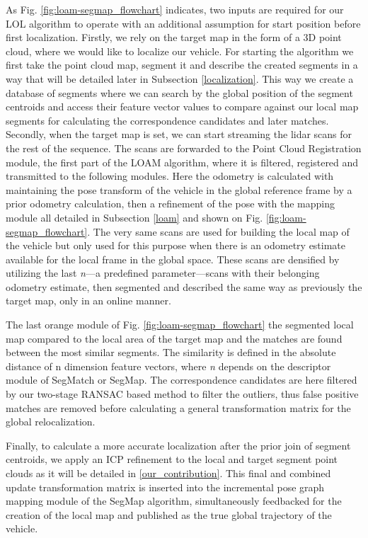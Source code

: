 \documentclass[letterpaper, 10 pt, conference]{ieeeconf}  %
\begin{document}
As Fig. \ref{fig:loam-segmap_flowchart} indicates, two inputs are required for our LOL algorithm to operate with an additional assumption for start position before first localization. Firstly, we rely on the target map in the form of a 3D point cloud, where we would like to localize our vehicle. For starting the algorithm we first take the point cloud map, segment it and describe the created segments in a way that will be detailed later in Subsection \ref{localization}. This way we create a database of segments where we can search by the global position of the segment centroids and access their feature vector values to compare against our local map segments for calculating the correspondence candidates and later matches. Secondly, when the target map is set, we can start streaming the lidar scans for the rest of the sequence. The scans are forwarded to the Point Cloud Registration module, the first part of the LOAM algorithm, where it is filtered, registered and transmitted to the following modules. Here the odometry is calculated with maintaining the pose transform of the vehicle in the global reference frame by a prior odometry calculation, then a refinement of the pose with the mapping module all detailed in Subsection \ref{loam} and shown on Fig. \ref{fig:loam-segmap_flowchart}. The very same scans are used for building the local map of the vehicle but only used for this purpose when there is an odometry estimate available for the local frame in the global space. These scans are densified by utilizing the last \textit{n}---a predefined parameter---scans with their belonging odometry estimate, then segmented and described the same way as previously the target map, only in an online manner. 

The last orange module of Fig. \ref{fig:loam-segmap_flowchart} the segmented local map compared to the local area of the target map and the matches are found between the most similar segments. The similarity is defined in the absolute distance of n dimension feature vectors, where \textit{n} depends on the descriptor module of SegMatch \cite{segmatch} or SegMap. The correspondence candidates are here filtered by our two-stage RANSAC based method to filter the outliers, thus false positive matches are removed before calculating a general transformation matrix for the global relocalization. 

Finally, to calculate a more accurate localization after the prior join of segment centroids, we apply an ICP refinement to the local and target segment point clouds as it will be detailed in \ref{our_contribution}. This final and combined update transformation matrix is inserted into the incremental pose graph mapping module of the SegMap algorithm, simultaneously feedbacked for the creation of the local map and published as the true global trajectory of the vehicle.
\end{document}
